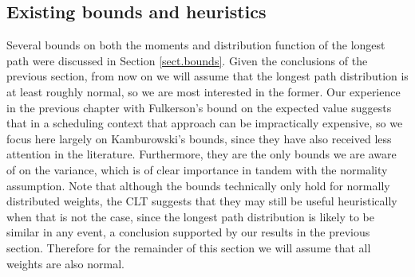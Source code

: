 \documentclass[12pt]{article}
\begin{document}

\subsection{Existing bounds and heuristics}
\label{subsect.results_existing}

Several bounds on both the moments and distribution function of the longest path were discussed in Section \ref{sect.bounds}. Given the conclusions of the previous section, from now on we will assume that the longest path distribution is at least roughly normal, so we are most interested in the former. Our experience in the previous chapter with Fulkerson's bound on the expected value suggests that in a scheduling context that approach can be impractically expensive, so we focus here largely on Kamburowski's bounds, since they have also received less attention in the literature. Furthermore, they are the only bounds we are aware of on the variance, which is of clear importance in tandem with the normality assumption. Note that although the bounds technically only hold for normally distributed weights, the CLT suggests that they may still be useful heuristically when that is not the case, since the longest path distribution is likely to be similar in any event, a conclusion supported by our results in the previous section. Therefore for the remainder of this section we will assume that all weights are also normal.
\end{document}
